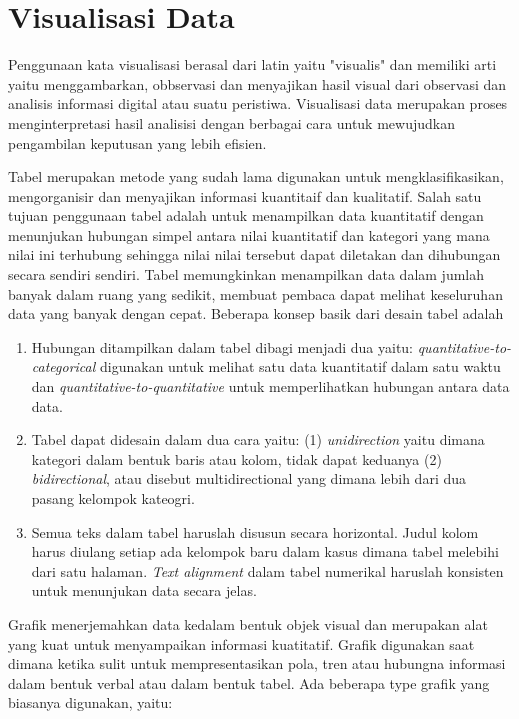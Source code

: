 \section{Visualisasi Data}
Penggunaan kata visualisasi berasal dari latin yaitu "visualis" dan memiliki arti yaitu menggambarkan, obbservasi dan menyajikan hasil visual dari observasi dan analisis informasi digital atau suatu peristiwa. Visualisasi data merupakan proses menginterpretasi hasil analisisi dengan berbagai cara untuk mewujudkan pengambilan keputusan yang lebih efisien.

Tabel merupakan metode yang sudah lama digunakan untuk mengklasifikasikan, mengorganisir dan menyajikan informasi kuantitaif dan kualitatif. Salah satu tujuan penggunaan tabel adalah untuk menampilkan data kuantitatif dengan menunjukan hubungan simpel antara nilai kuantitatif dan kategori yang mana nilai ini terhubung sehingga nilai nilai tersebut dapat diletakan dan dihubungan secara sendiri sendiri. Tabel memungkinkan menampilkan data dalam jumlah banyak dalam ruang yang sedikit, membuat pembaca dapat melihat keseluruhan data yang banyak dengan cepat. Beberapa konsep basik dari desain tabel adalah \citep{datavisualization1}

\begin{enumerate}
	\item Hubungan ditampilkan dalam tabel dibagi menjadi dua yaitu: \textit{quantitative-to-categorical} digunakan untuk melihat satu data kuantitatif dalam satu waktu dan \textit{quantitative-to-quantitative} untuk memperlihatkan hubungan antara data data.
	\item Tabel dapat didesain dalam dua cara yaitu: (1) \textit{unidirection} yaitu dimana kategori dalam bentuk baris atau kolom, tidak dapat keduanya (2) \textit{bidirectional}, atau disebut multidirectional yang dimana lebih dari dua pasang kelompok kateogri.
	\item Semua teks dalam tabel haruslah disusun secara horizontal. Judul kolom harus diulang setiap ada kelompok baru dalam kasus dimana tabel melebihi dari satu halaman. \textit{Text alignment} dalam tabel numerikal haruslah konsisten untuk menunjukan data secara jelas.
\end{enumerate}

Grafik menerjemahkan data kedalam bentuk objek visual dan merupakan alat yang kuat untuk menyampaikan informasi kuatitatif. Grafik digunakan saat dimana ketika sulit untuk mempresentasikan pola, tren atau hubungna informasi dalam bentuk verbal atau dalam bentuk tabel. Ada beberapa type grafik yang biasanya digunakan, yaitu: \citep{datavisualization1}

